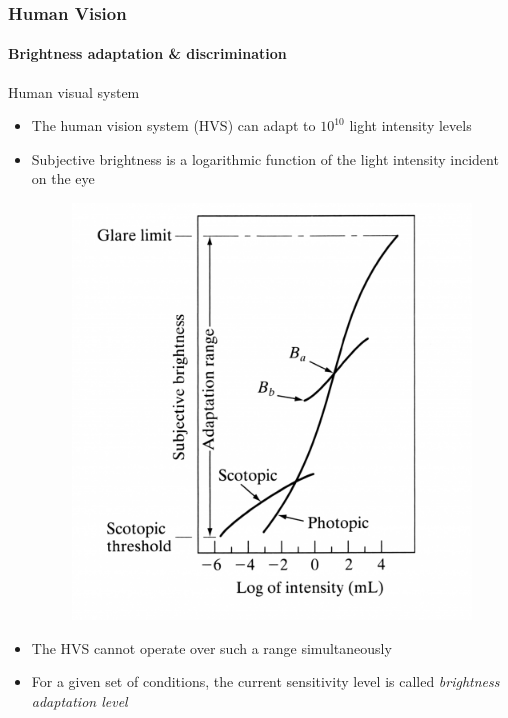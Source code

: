 \documentclass{beamer}
\begin{document}
\begin{frame}
  \frametitle{Human Vision}
  \framesubtitle{Brightness adaptation \& discrimination}
  \begin{block}{Human visual system}
    \begin{itemize}\scriptsize
    \item The human vision system (HVS) can adapt to $10^{10}$ light intensity levels
    \item Subjective brightness is a logarithmic function of the light intensity incident on the eye
      \begin{figure}
        \centering
        \includegraphics[height=.35\textheight]{./images/sb.png}
      \end{figure}
    \item The HVS cannot operate over such a range simultaneously
    \item For a given set of conditions, the current sensitivity level is called \emph{brightness adaptation level}
    \end{itemize}
  \end{block}
\end{frame}
\end{document}

